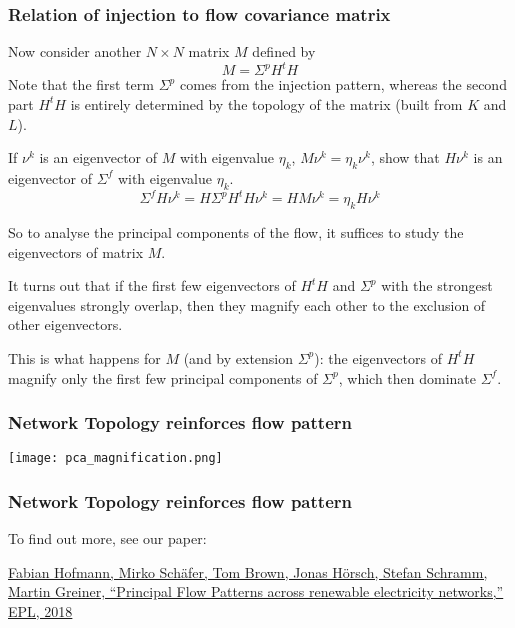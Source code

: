 \documentclass[10pt,aspectratio=169,dvipsnames]{beamer}
\begin{document}
\begin{frame}
  \frametitle{Relation of injection to flow covariance matrix}
  Now consider another $N\times N$ matrix $M$ defined by
  \begin{equation*}
    M = \Sigma^p H^tH
  \end{equation*}
  Note that the first term $\Sigma^p$ comes from the injection
  pattern, whereas the second part $H^tH$ is entirely determined by
  the topology of the matrix (built from $K$ and $L$).

  If $\nu^k$ is an eigenvector of $M$ with eigenvalue $\eta_k$, $M\nu^k = \eta_k \nu^k$, show that $H\nu^k$ is an eigenvector of $\Sigma^f$ with eigenvalue $\eta_k$.
  \pause
  \begin{equation*}
    \Sigma^f H\nu^k = H \Sigma^p H^t H \nu^k = H M \nu^k = \eta_k H\nu^k
  \end{equation*}

  So to analyse the principal components of the flow, it suffices to study the eigenvectors of matrix $M$.

  It turns out that if the first few eigenvectors of $H^t H$ and
  $\Sigma^p$ with the strongest eigenvalues strongly overlap, then they magnify each other to the
  exclusion of other eigenvectors.

  This is what happens for $M$ (and by extension $\Sigma^p$): the eigenvectors of $H^tH$ magnify only the first few principal components of $\Sigma^p$, which then dominate $\Sigma^f$.

\end{frame}

\begin{frame}
  \frametitle{Network Topology reinforces flow pattern}

  \centering
  \texttt{[image: pca\_magnification.png]}

\end{frame}



\begin{frame}
  \frametitle{Network Topology reinforces flow pattern}

  To find out more, see our paper:

  \href{https://arxiv.org/abs/1807.07771}{Fabian Hofmann, Mirko Schäfer, Tom Brown, Jonas Hörsch, Stefan Schramm, Martin Greiner, ``Principal Flow Patterns across renewable electricity networks,'' EPL, 2018}

\end{frame}
\end{document}
